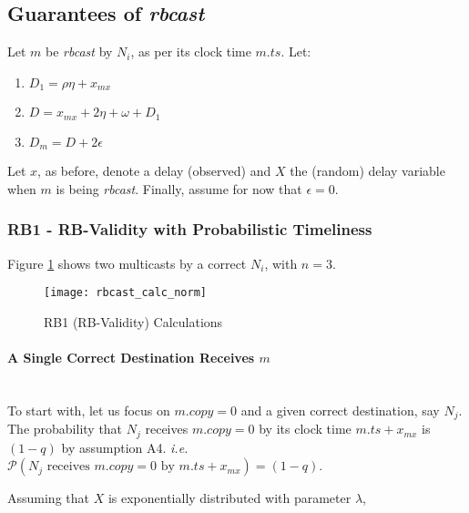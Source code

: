         \subsection*{Guarantees of \emph{rbcast}}
        Let $m$ be \emph{rbcast} by $N_i$, as per its clock time $m.ts$.  Let:
        
        \begin{enumerate}[label=\roman*]
            \item    $D_1 = \rho \eta + x_{mx}$
            \item    $D = x_{mx}  + 2\eta + \omega + D_1$
            \item    $D_m  = D  + 2\epsilon$
        \end{enumerate}
        
        Let $x$, as before, denote a delay (observed) and $X$ the (random) delay variable when $m$ is being \emph{rbcast}.  Finally, assume for now that $\epsilon = 0$.  
        
        \subsubsection*{RB1 - RB-Validity with Probabilistic Timeliness}        
        
        Figure \ref{fig:rbcast_calc} shows two multicasts by a correct $N_i$, with $n = 3$.  
        \begin{figure}[H]
                \centering    
                \centerline{\texttt{[image: rbcast\_calc\_norm]}}
                \caption[RB1 (RB-Validity) Calculations]{RB1 (RB-Validity) Calculations}
                \label{fig:rbcast_calc}
        \end{figure}    
        
        \paragraph{A Single Correct Destination Receives $m$}\hfill \\   
        To start with, let us focus on $m.copy = 0$ and a given correct destination, say $N_j$.  The probability that $N_j$ receives $m.copy = 0$ by its clock time $m.ts + x_{mx}$ is $(1 - q)$ by assumption A4.  \emph{i.e.} $\mathcal{P}(N_j\text{ receives } m.copy = 0 \text{ by } m.ts + x_{mx}) = (1 - q)$.  
        
        Assuming that $X$ is exponentially distributed with parameter $\lambda$, 
        
